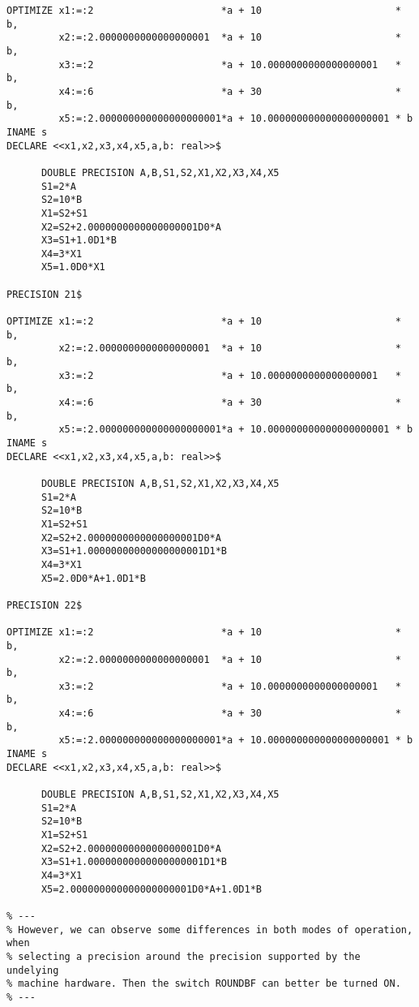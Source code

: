{\begin{verbatim}
OPTIMIZE x1:=:2                      *a + 10                       * b,
         x2:=:2.0000000000000000001  *a + 10                       * b,
         x3:=:2                      *a + 10.0000000000000000001   * b,
         x4:=:6                      *a + 30                       * b,
         x5:=:2.000000000000000000001*a + 10.000000000000000000001 * b
INAME s
DECLARE <<x1,x2,x3,x4,x5,a,b: real>>$

      DOUBLE PRECISION A,B,S1,S2,X1,X2,X3,X4,X5
      S1=2*A
      S2=10*B
      X1=S2+S1
      X2=S2+2.0000000000000000001D0*A
      X3=S1+1.0D1*B
      X4=3*X1
      X5=1.0D0*X1

PRECISION 21$

OPTIMIZE x1:=:2                      *a + 10                       * b,
         x2:=:2.0000000000000000001  *a + 10                       * b,
         x3:=:2                      *a + 10.0000000000000000001   * b,
         x4:=:6                      *a + 30                       * b,
         x5:=:2.000000000000000000001*a + 10.000000000000000000001 * b
INAME s
DECLARE <<x1,x2,x3,x4,x5,a,b: real>>$

      DOUBLE PRECISION A,B,S1,S2,X1,X2,X3,X4,X5
      S1=2*A
      S2=10*B
      X1=S2+S1
      X2=S2+2.0000000000000000001D0*A
      X3=S1+1.00000000000000000001D1*B
      X4=3*X1
      X5=2.0D0*A+1.0D1*B

PRECISION 22$

OPTIMIZE x1:=:2                      *a + 10                       * b,
         x2:=:2.0000000000000000001  *a + 10                       * b,
         x3:=:2                      *a + 10.0000000000000000001   * b,
         x4:=:6                      *a + 30                       * b,
         x5:=:2.000000000000000000001*a + 10.000000000000000000001 * b
INAME s
DECLARE <<x1,x2,x3,x4,x5,a,b: real>>$

      DOUBLE PRECISION A,B,S1,S2,X1,X2,X3,X4,X5
      S1=2*A
      S2=10*B
      X1=S2+S1
      X2=S2+2.0000000000000000001D0*A
      X3=S1+1.00000000000000000001D1*B
      X4=3*X1
      X5=2.000000000000000000001D0*A+1.0D1*B

% ---
% However, we can observe some differences in both modes of operation, when
% selecting a precision around the precision supported by the undelying
% machine hardware. Then the switch ROUNDBF can better be turned ON.
% ---
\end{verbatim}}
